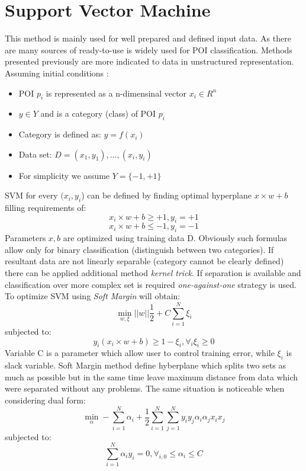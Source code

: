 \section{Support Vector Machine}
This method is mainly used for well prepared and defined input data. As there are many sources of ready-to-use is widely used for POI classification. Methods presented previously are more indicated to data in unstructured representation. Assuming initial conditions \cite{6}:
\begin{itemize}
	\item POI $p_i$ is represented as a n-dimensinal vector $x_i \in R^n$
	\item $y \in Y$ and is a category (class) of POI $p_i$
	\item Category is defined as: $y=f(x_i)$
	\item Data set: $D={(x_1,y_1),...,(x_i,y_i)}$
	\item For simplicity we assume $Y=\{-1,+1\}$
\end{itemize}
SVM for every $(x_i,y_i$) can be defined by finding optimal hyperplane $x \times w + b$ filling requirements of:
\begin{equation}
x_i \times w + b \geq +1, y_i= +1
\end{equation}
\begin{equation}
x_i \times w + b \leq -1, y_i= -1
\end{equation}
Parameters $x,b$ are optimized using training data D. Obviously such formulas allow only for binary classification (distinguish between two categories). If resultant data are not linearly separable (category cannot be clearly defined) there can be applied additional method \textit{kernel trick}. If separation is available and classification over more complex set is required \textit{one-against-one}\cite{7} strategy is used. To optimize SVM using \textit{Soft Margin} will obtain:
\begin{equation}
\min_{w,\xi} ||w||\frac{1}{2} + C\sum_{i=1}^{N}\xi_i
\end{equation}
subjected to:
\begin{equation}
y_i (x_i \times w + b) \geq 1 - \xi_i,  \forall_i \xi_i \geq 0
\end{equation}
Variable C is a parameter which allow user to control training error, while $\xi_i$ is slack variable. Soft Margin method define hyberplane which splits two sets as much as possible but in the same time leave maximum distance from data which were separated without any problems.\cite{7}
The same situation is noticeable when considering dual form:
\begin{equation}
\min_\alpha - \sum_{i=1}^{N}\alpha_i + \frac{1}{2}\sum_{i=1}^{N}\sum_{j=1}^{N}y_iy_j\alpha_i\alpha_jx_ix_j
\end{equation}
subjected to:
\begin{equation}
\sum_{i=1}^{N}\alpha_iy_i=0, \forall_{i,0} \leq \alpha_i \leq C
\end{equation}
